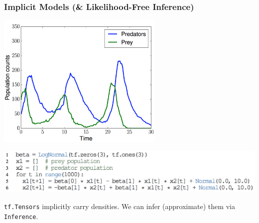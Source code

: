 \documentclass[10pt,
               xcolor={usenames,dvipsnames},
               hyperref={colorlinks,linktoc=all,citecolor=Plum,linkcolor=MidnightBlue,urlcolor=MidnightBlue},noamssymb]{beamer}
\begin{document}
\begin{frame}[plain,t]
\frametitle{Implicit Models (\& Likelihood-Free Inference)}
\begin{center}
\includegraphics[width=0.6\textwidth]{img/lotka_volterra_plot.png}
\end{center}

\begin{center}
\includegraphics[width=1.0\textwidth]{img/lotka_volterra_program.png}
\end{center}
\texttt{tf.Tensors} implicitly carry densities. We can infer (approximate)
them via \texttt{Inference}.
\end{frame}
\end{document}

